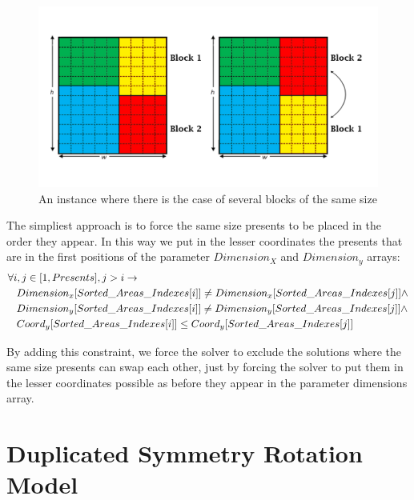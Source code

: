 \begin{figure}[ht]
	\centering
	\includegraphics[width=\textwidth]{images/duplicated_problem.png}
	\caption{An instance where there is the case of several blocks of the same size}
	\label{fig:overlaps}
\end{figure}

The simpliest approach is to force the same size presents to be placed in the order they appear. In this way we put in the lesser
coordinates the presents that are in the first positions of the parameter $Dimension_X$ and $Dimension_y$ arrays:\\

\begin{equation*}\begin{split}
    &\forall i, j \in [1, Presents], j > i \rightarrow \\
    &\hspace{0.3cm} Dimension_x[Sorted\_Areas\_Indexes[i]] \neq Dimension_x[Sorted\_Areas\_Indexes[j]] \wedge \\
    &\hspace{0.3cm} Dimension_y[Sorted\_Areas\_Indexes[i]] \neq Dimension_y[Sorted\_Areas\_Indexes[j]] \wedge \\
    &\hspace{0.3cm} Coord_y[Sorted\_Areas\_Indexes[i]] \leq Coord_y[Sorted\_Areas\_Indexes[j]]
\end{split}\end{equation*}

By adding this constraint, we force the solver to exclude the solutions where the same size presents can swap each other,
just by forcing the solver to put them in the lesser coordinates possible as before they appear in the parameter dimensions array.



\newpage
\section{Duplicated Symmetry Rotation Model}

